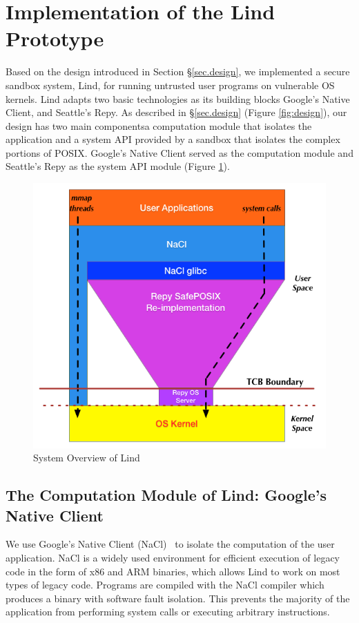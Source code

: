 \section{Implementation of the Lind Prototype}
\label{sec.implementation}

Based on the design introduced in Section \S{\ref{sec.design}}, 
we implemented a secure sandbox system, Lind, 
for running untrusted user programs on vulnerable OS kernels. 
Lind adapts two basic technologies as its building blocks\textendash 
Google's Native Client, and Seattle's Repy. 
As described in \S{\ref{sec.design}} (Figure \ref{fig:design}), our design has
two main components\textendash a computation module that isolates the 
application and a system API provided by a sandbox that isolates the complex 
portions of POSIX.
Google's Native Client served as the computation 
module 
and Seattle's Repy as the system API module (Figure \ref{fig:architecture}).

\begin{figure}[h]
\centering
\includegraphics[width=1.0\columnwidth]{diagram/lind_architecture.png}
\caption{System Overview of Lind}
\label{fig:architecture}
\end{figure}

\subsection{The Computation Module of Lind: Google's Native Client}
We use Google's Native Client (NaCl)~\cite{NaCl-09} to isolate the computation
of the user application.  NaCl is a widely used environment for efficient 
execution of legacy code in the form of x86 and ARM binaries, which allows
Lind to work on most types of legacy code.   Programs are compiled with
the NaCl compiler which produces a binary with software fault isolation.
This prevents the majority of the application from performing system calls 
or executing arbitrary instructions. 

